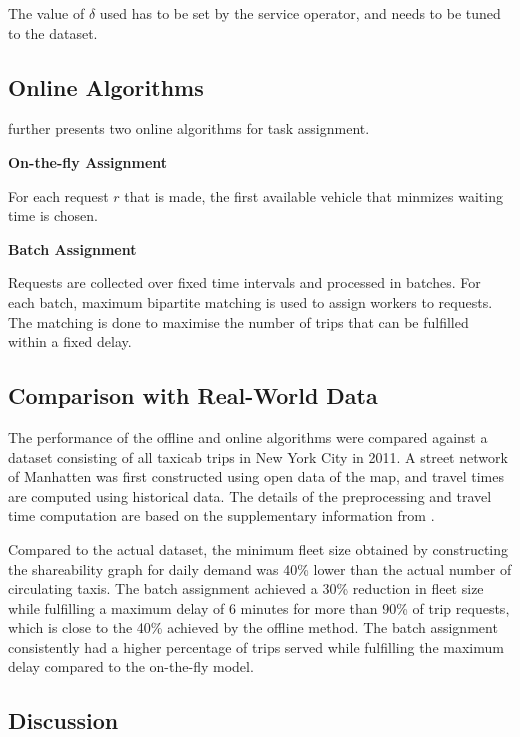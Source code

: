 \documentclass[urop]{socreport}
\begin{document}
The value of $\delta$ used has to be set by the service operator, and needs to be tuned to the dataset.  

\subsection{Online Algorithms}
\cite{nature} further presents two online algorithms for task assignment.

\vspace{2mm} \noindent \textbf{On-the-fly Assignment}

\noindent For each request $r$ that is made, the first available vehicle that minmizes waiting time is chosen.

\vspace{2mm} \noindent \textbf{Batch Assignment}

\noindent Requests are collected over fixed time intervals and processed in batches. For each batch, maximum bipartite matching is used to assign workers to requests. The matching is done to maximise the number of trips that can be fulfilled within a fixed delay.

\subsection{Comparison with Real-World Data}
The performance of the offline and online algorithms were compared against a dataset consisting of all taxicab trips in New York City in 2011. A street network of Manhatten was first constructed using open data of the map, and travel times are computed using historical data. The details of the preprocessing and travel time computation are based on the supplementary information from \cite{preprocess}. 

Compared to the actual dataset, the minimum fleet size obtained by constructing the shareability graph for daily demand was 40\% lower than the actual number of circulating taxis. The batch assignment achieved a 30\% reduction in fleet size while fulfilling a maximum delay of 6 minutes for more than 90\% of trip requests, which is close to the 40\% achieved by the offline method. The batch assignment consistently had a higher percentage of trips served while fulfilling the maximum delay compared to the on-the-fly model.

\subsection{Discussion}
\end{document}
